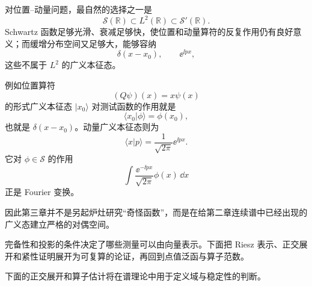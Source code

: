 对位置--动量问题，最自然的选择之一是
\[
\mathcal S(\mathbb R)
\subset L^2(\mathbb R)
\subset\mathcal S'(\mathbb R).
\]
Schwartz 函数足够光滑、衰减足够快，使位置和动量算符的反复作用仍有良好意义；而缓增分布空间又足够大，能够容纳
\[
\delta(x-x_0),
\qquad
\ee^{\ii px},
\]
这些不属于 $L^2$ 的广义本征态。

例如位置算符
\[
(Q\psi)(x)=x\psi(x)
\]
的形式广义本征态 $|x_0\rangle$ 对测试函数的作用就是
\[
\langle x_0|\phi\rangle=\phi(x_0),
\]
也就是 $\delta(x-x_0)$。动量广义本征态则为
\[
\langle x|p\rangle
=\frac1{\sqrt{2\pi}}\ee^{\ii px}.
\]
它对 $\phi\in\mathcal S$ 的作用
\[
\int\frac{\ee^{-\ii px}}{\sqrt{2\pi}}\phi(x)\,\dd x
\]
正是 Fourier 变换。

因此第三章并不是另起炉灶研究“奇怪函数”，而是在给第二章连续谱中已经出现的广义态建立严格的对偶空间。


完备性和投影的条件决定了哪些测量可以由向量表示。下面把 Riesz 表示、正交展开和紧性证明展开为可复算的论证，再回到点值泛函与算子范数。



下面的正交展开和算子估计将在谱理论中用于定义域与稳定性的判断。


